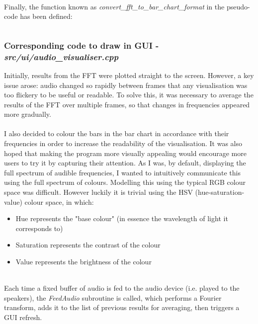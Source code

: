 \paragraph{}
Finally, the function known as \textit{convert\_fft\_to\_bar\_chart\_format} in the pseudo-code has been defined:
\inputminted[linenos, firstline=81, lastline=148]{c++}{../src/effects/fft.cpp}

\pagebreak
\subsubsection{Corresponding code to draw in GUI - \textit{src/ui/audio\_visualiser.cpp}}
Initially, results from the FFT were plotted straight to the screen. However, a key issue arose: audio changed so rapidly between frames that any visualisation was too flickery to be useful or readable.  To solve this, it was necessary to average the results of the FFT over multiple frames, so that changes in frequencies appeared more gradually. 

\paragraph{}
I also decided to colour the bars in the bar chart in accordance with their frequencies in order to increase the readability of the visualisation. It was also hoped that making the program more visually appealing would encourage more users to try it by capturing their attention. As I was, by default, displaying the full spectrum of audible frequencies, I wanted to intuitively communicate this using the full spectrum of colours. Modelling this using the typical RGB colour space was difficult. However luckily it is trivial using the HSV (hue-saturation-value) colour space, in which:
\begin{itemize}
	\item Hue represents the "base colour" (in essence the wavelength of light it corresponds to)
	\item Saturation represents the contrast of the colour
	\item Value represents the brightness of the colour
\end{itemize}
\inputminted[linenos, firstline=133, lastline=164]{c++}{../src/ui/audio_visualiser.cpp}

\paragraph{}
Each time a fixed buffer of audio is fed to the audio device (i.e. played to the speakers), the \textit{FeedAudio} subroutine is called, which performs a Fourier transform, adds it to the list of previous results for averaging, then triggers a GUI refresh.
\inputminted[linenos, firstline=15, lastline=44]{c++}{../src/ui/audio_visualiser.cpp}

